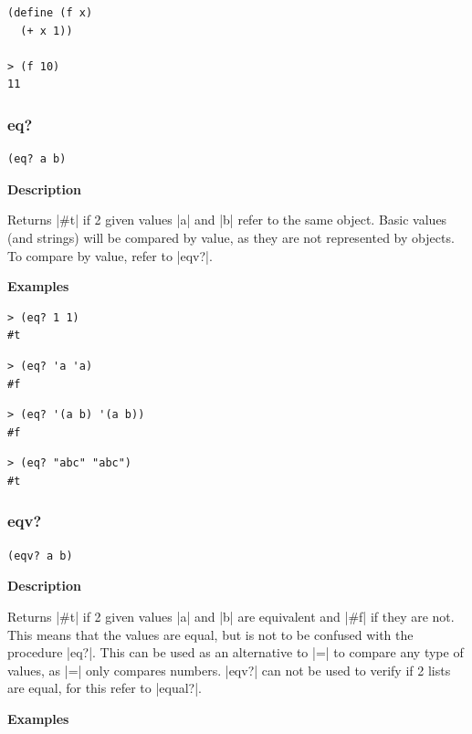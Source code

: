 \documentclass[a4paper]{article}
\begin{document}
\begin{lstlisting}
(define (f x)
  (+ x 1))
  
> (f 10)
11
\end{lstlisting}


\subsubsection{eq?}

\begin{lstlisting}[frame=none]
(eq? a b)
\end{lstlisting}

\textbf{Description}

Returns |#t| if 2 given values |a| and |b| refer to the same object. Basic values (and strings) will be compared by value, as they are not represented by objects. To compare by value, refer to |eqv?|.

\textbf{Examples}

\begin{lstlisting}
> (eq? 1 1)
#t
\end{lstlisting}

\begin{lstlisting}
> (eq? 'a 'a)
#f
\end{lstlisting}

\begin{lstlisting}
> (eq? '(a b) '(a b))
#f
\end{lstlisting}

\begin{lstlisting}
> (eq? "abc" "abc")
#t
\end{lstlisting}


\subsubsection{eqv?}

\begin{lstlisting}[frame=none]
(eqv? a b)
\end{lstlisting}

\textbf{Description}

Returns |#t| if 2 given values |a| and |b| are equivalent and |#f| if they are not. This means that the values are equal, but is not to be confused with the procedure |eq?|. This can be used as an alternative to |=| to compare any type of values, as |=| only compares numbers. |eqv?| can not be used to verify if 2 lists are equal, for this refer to |equal?|.

\textbf{Examples}
\end{document}
